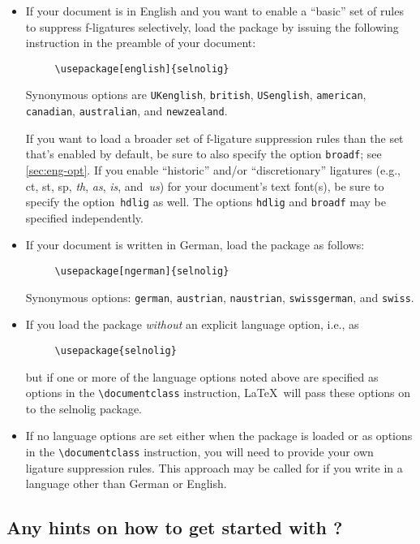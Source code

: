 \documentclass[11pt]{article}
\newcommand{\pkg}[1]{\textsf{#1}}
\newcommand{\opt}[1]{\texttt{#1}}
\newcommand{\cmmd}[1]{\texttt{\textbackslash #1}}
\begin{document}
\begin{itemize}
\item If your document is in English and you want to enable a \enquote{basic} set of rules to suppress f-ligatures selectively, load the package by issuing the following instruction in the preamble of your document:
\begin{Verbatim}
     \usepackage[english]{selnolig}
\end{Verbatim}
Synonymous options are \opt{UKenglish}, \opt{british}, \opt{USenglish}, \opt{american}, \opt{cana\-dian}, \opt{australian}, and \opt{new\-zea\-land}.

If you want to load a broader set of f-ligature suppression rules than the set that's enabled by default, be sure to also specify the option \opt{broadf}; see \cref{sec:eng-opt}.
If you enable \enquote{historic} and/or \enquote{discretionary} ligatures (e.g., ct, st, sp, \emph{th}, \emph{as}, \emph{is}, and~\emph{us}) for your document's text font(s), be sure to specify the option~\opt{hdlig} as well. The options \opt{hdlig} and \opt{broadf} may be specified independently.

\item If your document is written in German, load the package as follows:
\begin{Verbatim}
     \usepackage[ngerman]{selnolig}
\end{Verbatim}
Synonymous options: \opt{german}, \opt{austrian}, \opt{naustrian}, \opt{swissgerman}, and \opt{swiss}.

\item If you load the package \emph{without} an explicit language option, i.e., as
\begin{Verbatim}
     \usepackage{selnolig}
\end{Verbatim}
but if one or more of the language options noted above are specified as options in the \cmmd{documentclass} instruction, \LaTeX\ will pass these options on to the \pkg{selnolig} package.

\item If no language options are set either when the package is loaded or as options in the \cmmd{documentclass} instruction, you will need to provide your own ligature suppression rules. This approach may be called for if you write in a language other than German or English.

\end{itemize}


\subsection{Any hints on how to get started with \LuaLaTeX?}
\end{document}
